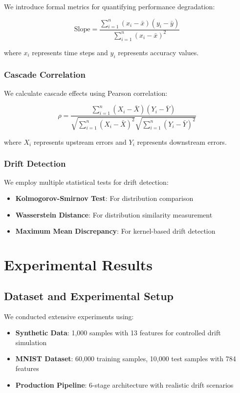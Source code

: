 \documentclass{article}
\begin{document}
We introduce formal metrics for quantifying performance degradation:

\begin{equation}
\text{Slope} = \frac{\sum_{i=1}^{n} (x_i - \bar{x})(y_i - \bar{y})}{\sum_{i=1}^{n} (x_i - \bar{x})^2}
\end{equation}

where $x_i$ represents time steps and $y_i$ represents accuracy values.

\subsubsection{Cascade Correlation}

We calculate cascade effects using Pearson correlation:

\begin{equation}
\rho = \frac{\sum_{i=1}^{n} (X_i - \bar{X})(Y_i - \bar{Y})}{\sqrt{\sum_{i=1}^{n} (X_i - \bar{X})^2} \sqrt{\sum_{i=1}^{n} (Y_i - \bar{Y})^2}}
\end{equation}

where $X_i$ represents upstream errors and $Y_i$ represents downstream errors.

\subsubsection{Drift Detection}

We employ multiple statistical tests for drift detection:

\begin{itemize}
    \item \textbf{Kolmogorov-Smirnov Test}: For distribution comparison
    \item \textbf{Wasserstein Distance}: For distribution similarity measurement
    \item \textbf{Maximum Mean Discrepancy}: For kernel-based drift detection
\end{itemize}

\section{Experimental Results}

\subsection{Dataset and Experimental Setup}

We conducted extensive experiments using:
\begin{itemize}
    \item \textbf{Synthetic Data}: 1,000 samples with 13 features for controlled drift simulation
    \item \textbf{MNIST Dataset}: 60,000 training samples, 10,000 test samples with 784 features
    \item \textbf{Production Pipeline}: 6-stage architecture with realistic drift scenarios
\end{itemize}
\end{document}
